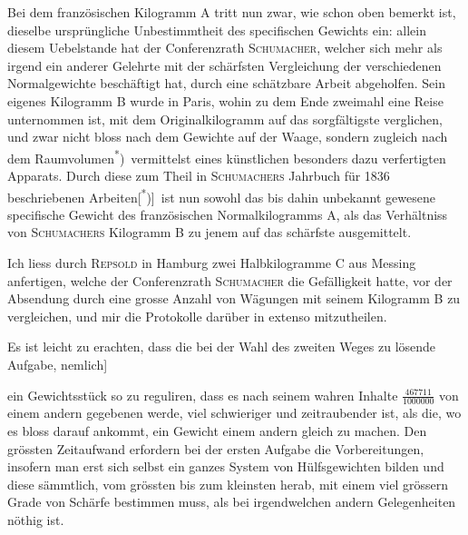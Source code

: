 Bei dem französischen Kilogramm A tritt nun zwar, wie schon oben bemerkt
ist, dieselbe ursprüngliche Unbestimmtheit des specifischen Gewichts ein: allein
diesem Uebelstande hat der Conferenzrath \textsc{Schumacher}, welcher sich mehr als
irgend ein anderer Gelehrte mit der schärfsten Vergleichung der verschiedenen
Normalgewichte beschäftigt hat, durch eine schätzbare Arbeit abgeholfen.
Sein eigenes Kilogramm B wurde in Paris, wohin zu dem Ende zweimahl
eine Reise unternommen ist, mit dem Originalkilogramm auf das sorgfältigste
verglichen, und zwar nicht bloss nach dem Gewichte auf der Waage, sondern
zugleich nach dem Raumvolumen\textsuperscript{*})\begingroup\renewcommand{\thefootnote}{}\endgroup\ vermittelst eines künstlichen besonders
\HistoricalFoot{}{2\textsuperscript{*}}
\clearpage{}
\noindent dazu verfertigten Apparats. Durch diese zum Theil in \textsc{Schumachers} Jahrbuch
für 1836 beschriebenen Arbeiten[\textsuperscript{*})]\begingroup\renewcommand{\thefootnote}{}\endgroup\ ist nun sowohl das bis dahin unbekannt
gewesene specifische Gewicht des französischen Normalkilogramms A, als das
Verhältniss von \textsc{Schumachers} Kilogramm B zu jenem auf das schärfste ausgemittelt.

Ich liess durch \textsc{Repsold} in Hamburg zwei Halbkilogramme C aus Messing
anfertigen, welche der Conferenzrath \textsc{Schumacher} die Gefälligkeit hatte, vor
der Absendung durch eine grosse Anzahl von Wägungen mit seinem Kilogramm
B zu vergleichen, und mir die Protokolle darüber in extenso mitzutheilen.

Es ist leicht zu erachten, dass die bei der Wahl des zweiten Weges zu
lösende Aufgabe, nemlich]

ein Gewichtsstück so zu reguliren, dass es nach seinem wahren Inhalte
\(\frac{467711}{1000000}\) von einem andern gegebenen werde, viel schwieriger und zeitraubender
ist, als die, wo es bloss darauf ankommt, ein Gewicht einem andern gleich
zu machen. Den grössten Zeitaufwand erfordern bei der ersten Aufgabe die
Vorbereitungen, insofern man erst sich selbst ein ganzes System von Hülfsgewichten
bilden und diese sämmtlich, vom grössten bis zum kleinsten herab,
mit einem viel grössern Grade von Schärfe bestimmen muss, als bei irgendwelchen
andern Gelegenheiten nöthig ist.

